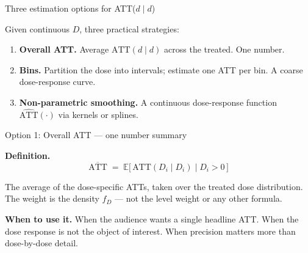 \documentclass[aspectratio=169,12pt,t]{beamer}
\begin{document}


\begin{frame}{Three estimation options for ATT($d \mid d$)}
\vspace{0.2cm}

Given continuous $D$, three practical strategies:

\vspace{0.4cm}

\begin{enumerate}\setlength\itemsep{5pt}
  \item \textbf{Overall ATT.} \;Average $\text{ATT}(d \mid d)$ across the treated. \;One number.
  \item \textbf{Bins.} \;Partition the dose into intervals; estimate one ATT per bin. \;A coarse dose-response curve.
  \item \textbf{Non-parametric smoothing.} \;A continuous dose-response function $\widehat{\text{ATT}}(\cdot)$ via kernels or splines.
\end{enumerate}

\vspace{0.4em}
\end{frame}

\begin{frame}{Option 1: Overall ATT --- one number summary}
\vspace{0.2cm}

\textbf{Definition.}
\[
\overline{\text{ATT}} \;=\; \mathbb{E}\big[\,\text{ATT}(D_i \mid D_i) \mid D_i > 0\,\big]
\]

\vspace{0.4cm}

The average of the dose-specific ATTs, taken over the treated dose distribution. \;The weight is the density $f_D$ --- not the level weight or any other formula.

\vspace{0.4cm}

\textbf{When to use it.} \;When the audience wants a single headline ATT. \;When the dose response is not the object of interest. \;When precision matters more than dose-by-dose detail.

\vspace{0.3em}
\end{frame}
\end{document}
